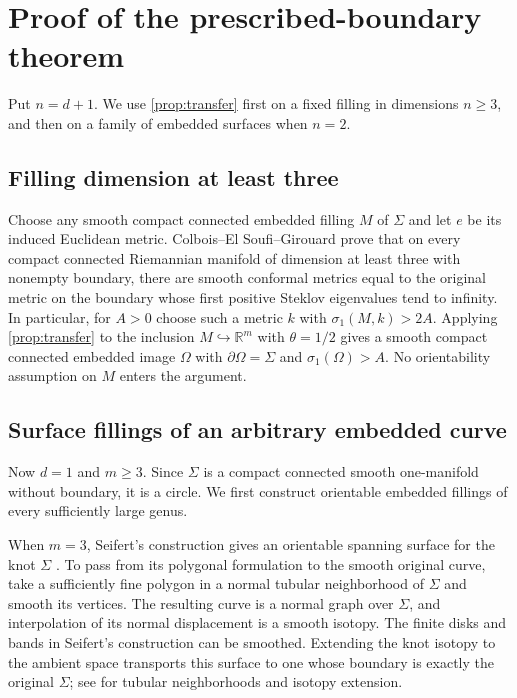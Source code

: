 \documentclass[11pt]{article}
\theoremstyle{remark}
\newcommand{\R}{\mathbb R}
\begin{document}
\section{Proof of the prescribed-boundary theorem}\label{sec:proof}

Put $n=d+1$. We use \cref{prop:transfer} first on a fixed filling in
dimensions $n\geq3$, and then on a family of embedded surfaces when
$n=2$.

\subsection{Filling dimension at least three}

Choose any smooth compact connected embedded filling $M$ of $\Sigma$
and let $e$ be its induced Euclidean metric. Colbois--El Soufi--Girouard
\cite[Theorem~1.1(ii)]{CEG} prove that on every compact connected
Riemannian manifold of dimension at least three with nonempty boundary,
there are smooth conformal metrics equal to the original metric on the
boundary whose first positive Steklov eigenvalues tend to infinity.
In particular, for $A>0$ choose such a metric $k$ with
$\sigma_1(M,k)>2A$.
Applying \cref{prop:transfer} to the inclusion $M\hookrightarrow\R^m$
with $\theta=1/2$ gives a smooth compact connected embedded image
$\Omega$ with $\partial\Omega=\Sigma$ and $\sigma_1(\Omega)>A$.
No orientability assumption on $M$ enters the argument.

\subsection{Surface fillings of an arbitrary embedded curve}

Now $d=1$ and $m\geq3$. Since $\Sigma$ is a compact connected smooth
one-manifold without boundary, it is a circle. We first construct
orientable embedded fillings of every sufficiently large genus.

When $m=3$, Seifert's construction gives an orientable spanning surface
for the knot $\Sigma$ \cite[Section~1, pp.~572--573]{Seifert}.
To pass from its polygonal formulation to the smooth original curve,
take a sufficiently fine polygon in a normal tubular neighborhood of
$\Sigma$ and smooth its vertices. The resulting curve is a normal graph
over $\Sigma$, and interpolation of its normal displacement is a smooth
isotopy. The finite disks and bands in Seifert's construction can be
smoothed. Extending the knot isotopy to the ambient space transports
this surface to one whose boundary is exactly the original $\Sigma$;
see \cite[Theorems~4.5.1 and~8.1.3]{Hirsch} for tubular neighborhoods
and isotopy extension.
\end{document}
